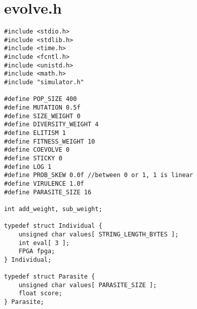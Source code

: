 \documentclass[ %
                    author={Alexander Dalton},
                supervisor={Prof. Seth Bullock},
                    degree={MEng},
                     title={Exploring Evolutionary Hardware and its Application to Dynamic Problems},
                  subtitle={},
                      type={research},
                      year={2018} ]{dissertation}
\begin{document}
\label{appx:sim}

\chapter{evolve.h}
\label{appx:evolve}
\begin{lstlisting}
#include <stdio.h>
#include <stdlib.h>
#include <time.h>
#include <fcntl.h>
#include <unistd.h>
#include <math.h>
#include "simulator.h"

#define POP_SIZE 400
#define MUTATION 0.5f
#define SIZE_WEIGHT 0
#define DIVERSITY_WEIGHT 4
#define ELITISM 1
#define FITNESS_WEIGHT 10
#define COEVOLVE 0
#define STICKY 0
#define LOG 1
#define PROB_SKEW 0.0f //between 0 or 1, 1 is linear
#define VIRULENCE 1.0f
#define PARASITE_SIZE 16

int add_weight, sub_weight;

typedef struct Individual {
	unsigned char values[ STRING_LENGTH_BYTES ];
	int eval[ 3 ];
	FPGA fpga;
} Individual;

typedef struct Parasite {
	unsigned char values[ PARASITE_SIZE ];
	float score;
} Parasite;
\end{lstlisting}

\end{document}
